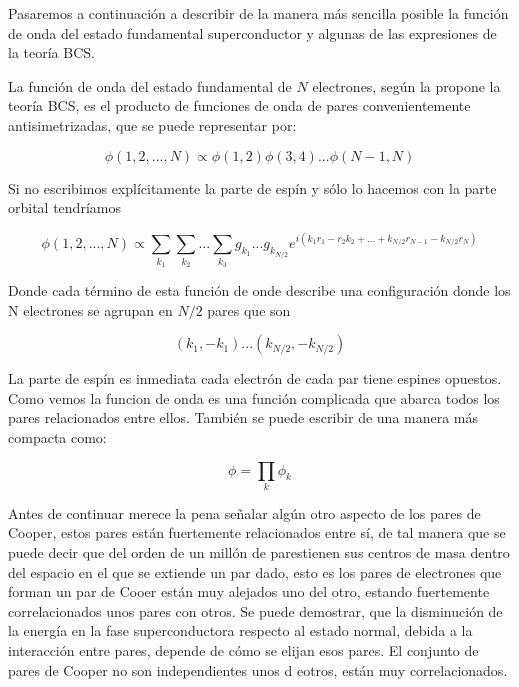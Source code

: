 Pasaremos a continuación a describir de la manera más sencilla posible la función de onda del estado fundamental superconductor y algunas de las expresiones de la teoría BCS.

La función de onda del estado fundamental de $N$ electrones, según la propone la teoría BCS, es el producto de funciones de onda de pares convenientemente antisimetrizadas, que se puede representar por:

\begin{equation}
    \phi(1,2,...,N) \propto \phi(1,2)\phi(3,4)...\phi(N-1,N)
\end{equation}

Si no escribimos explícitamente la parte de espín y sólo lo hacemos con la parte orbital tendríamos

\begin{equation}
    \phi(1,2,...,N) \propto \sum_{k_1} \sum_{k_2} ... \sum_{k_3} g_{k_1} ... g_{k_{N/2}} e^{i (k_1 r_1 - r_2 k_2 + ... + k_{N/2} r_{N-1} - k_{N/2} r_N)}
\end{equation}

Donde cada término de esta función de onde describe una configuración donde los N electrones se agrupan en $N/2$ pares que son

\begin{equation}
    (k_1, -k_1) ... (k_{N/2}, -k_{N/2})
\end{equation}

La parte de espín es inmediata cada electrón de cada par tiene espines opuestos. Como vemos la funcion de onda es una función complicada que abarca todos los pares relacionados entre ellos. También se puede escribir de una manera más compacta como:

\begin{equation}
    \phi = \prod\limits_k \phi_k
\end{equation}

Antes de continuar merece la pena señalar algún otro aspecto de los pares de Cooper, estos pares están fuertemente relacionados entre sí, de tal manera que se puede decir que del orden de un millón de parestienen sus centros de masa dentro del espacio en el que se extiende un par dado, esto es los pares de electrones que forman un par de Cooer están muy alejados uno del otro, estando fuertemente correlacionados unos pares con otros. Se puede demostrar, que la disminución de la energía en la fase superconductora respecto al estado normal, debida a la interacción entre pares, depende de cómo se elijan esos pares. El conjunto de pares de Cooper no son independientes unos d eotros, están muy correlacionados.

